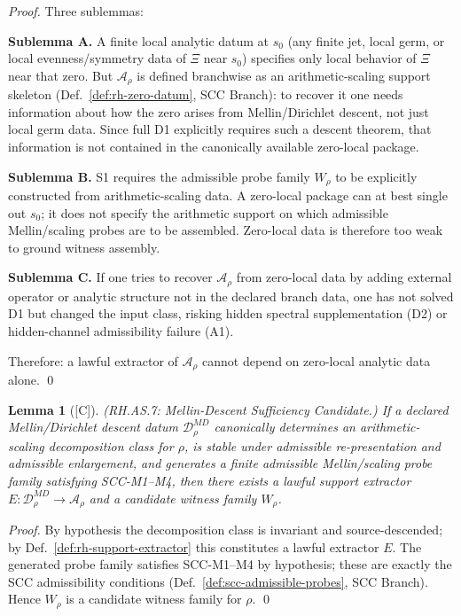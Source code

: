 \documentclass[12pt,oneside]{amsbook}
\theoremstyle{plain}
\newtheorem{lemma}[theorem]{Lemma}
\theoremstyle{definition}
\theoremstyle{remark}
\newcommand{\status}[1]{\textup{[#1]}}
\begin{document}
\begin{proof}
Three sublemmas:

\textbf{Sublemma A.} A finite local analytic datum at $s_0$
(any finite jet, local germ, or local evenness/symmetry data of
$\Xi$ near $s_0$) specifies only local behavior of $\Xi$ near that
zero. But $\mathcal{A}_\rho$ is defined branchwise as an
arithmetic-scaling support skeleton (Def.~\ref{def:rh-zero-datum},
SCC Branch): to recover it one needs information about how the zero
arises from Mellin/Dirichlet descent, not just local germ data.
Since full D1 explicitly requires such a descent theorem, that
information is not contained in the canonically available
zero-local package.

\textbf{Sublemma B.} S1 requires the admissible probe family
$W_\rho$ to be explicitly constructed from arithmetic-scaling data.
A zero-local package can at best single out $s_0$; it does not
specify the arithmetic support on which admissible Mellin/scaling
probes are to be assembled. Zero-local data is therefore too weak
to ground witness assembly.

\textbf{Sublemma C.} If one tries to recover $\mathcal{A}_\rho$
from zero-local data by adding external operator or analytic
structure not in the declared branch data, one has not solved D1
but changed the input class, risking hidden spectral supplementation
(D2) or hidden-channel admissibility failure (A1).

Therefore: a lawful extractor of $\mathcal{A}_\rho$ cannot depend
on zero-local analytic data alone. \qed
\end{proof}

\begin{lemma}[\status{C}]\label{lem:rh-as7}
\textup{(RH.AS.7: Mellin-Descent Sufficiency Candidate.)}
If a declared Mellin/Dirichlet descent datum
$\mathcal{D}_\rho^{MD}$ canonically determines an
arithmetic-scaling decomposition class for $\rho$, is stable under
admissible re-presentation and admissible enlargement, and
generates a finite admissible Mellin/scaling probe family satisfying
SCC-M1--M4, then there exists a lawful support extractor
$E:\mathcal{D}_\rho^{MD} \to \mathcal{A}_\rho$ and a candidate
witness family $W_\rho$.
\end{lemma}

\begin{proof}
By hypothesis the decomposition class is invariant and
source-descended; by Def.~\ref{def:rh-support-extractor} this
constitutes a lawful extractor $E$. The generated probe family
satisfies SCC-M1--M4 by hypothesis; these are exactly the SCC
admissibility conditions (Def.~\ref{def:scc-admissible-probes},
SCC Branch). Hence $W_\rho$ is a candidate witness family for
$\rho$. \qed
\end{proof}
\end{document}
